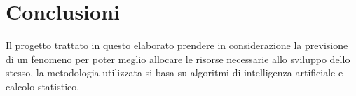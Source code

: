 \documentclass[%
    corpo=12pt,
    twoside,
    oldstyle,
    autoretitolo,
    greek,
    evenboxes,
]{toptesi}
\begin{document}

\chapter{Conclusioni}
Il progetto trattato in questo elaborato prendere in considerazione la previsione di un fenomeno per poter meglio allocare le risorse necessarie allo sviluppo dello stesso, la metodologia utilizzata si basa su algoritmi di intelligenza artificiale e calcolo statistico.\\




\end{document}
